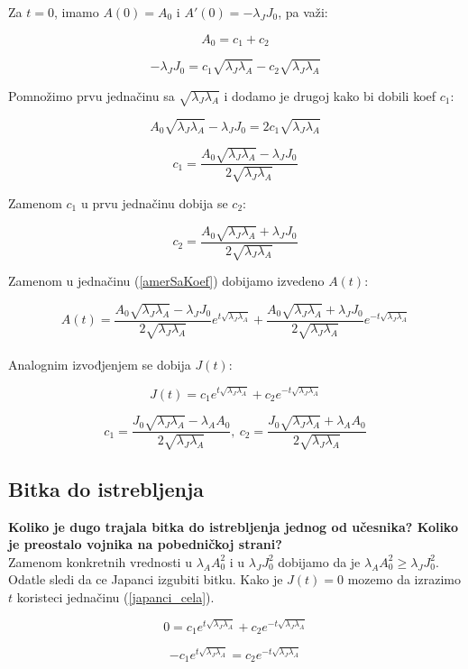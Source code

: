\documentclass{article}
\newcommand{\laj}{\sqrt{\lambda_J\lambda_A}}
\begin{document}
Za \(t = 0\), imamo  \(A(0) = A_0\) i
\(A'(0) = -\lambda_{J}J_0\), pa važi:

\[
  A_0 = c_1 + c_2
\]

\[
  -\lambda_{J}J_0 = c_1 \laj - c_2 \laj
\]

Pomnožimo prvu jednačinu sa \( \laj \) i dodamo je
drugoj kako bi dobili koef \( c_1 \):

\[
  A_0 \laj - \lambda_{J}J_0 = 2 c_1 \laj
\]

\[
  c_1 = \frac{A_0 \laj - \lambda_J J_0}{2\laj }
\]

Zamenom \(c_1\) u prvu jednačinu dobija se \(c_2\):

\[
  c_2 = \frac{A_0 \laj + \lambda_J J_0}{2\laj }
\]

Zamenom u jednačinu (\ref{amerSaKoef}) dobijamo izvedeno \(A(t)\):

\begin{equation}\label{ameri_cela}
  A(t) = \frac{A_0 \laj - \lambda_J J_0}{2 \laj } e^{t \laj } + \frac{A_0 \laj +
\lambda_J J_0}{2 \laj } e^{-t \laj}
\end{equation}
\\
Analognim izvođjenjem se dobija \(J(t)\):

\begin{equation}\label{japanci_cela}
  J(t) = c_1 e^{t \laj} + c_2 e^{-t \laj}
\end{equation}

\[
 c_1 = \frac{J_0 \laj- \lambda_A A_0}{2\laj},\ 
 c_2 = \frac{J_0 \laj+ \lambda_A A_0}{2 \laj}
\]


\newpage

\subsection{Bitka do istrebljenja}

\textbf{Koliko je dugo trajala bitka do istrebljenja jednog od
učesnika? Koliko je preostalo vojnika na pobedničkoj
strani?} \\


\hspace{5mm}
Zamenom konkretnih vrednosti u \(\lambda_{A}A_0^2\) i u \(\lambda_{J}J_0^2\)
dobijamo da je \(\lambda_{A}A_0^2 \geq \lambda_{J}J_0^2\). Odatle sledi da ce
Japanci izgubiti bitku.
Kako je \(J(t) = 0\) mozemo da izrazimo \(t\) koristeci jednačinu
(\ref{japanci_cela}).

\[
  0 = c_1 e^{t \laj} + c_2 e^{-t \laj}
\]

\[
  -c_1 e^{t \laj} = c_2 e^{-t \laj}
\]
\end{document}
